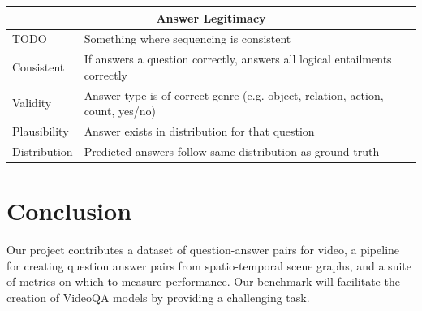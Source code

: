 \documentclass[10pt,twocolumn,letterpaper]{article}
\begin{document}
\begin{table}[]
\begin{center}
\begin{tabular}{|p{2cm}|p{5cm}|}
    
     \multicolumn{2}{|c|}{\textbf{Answer Legitimacy}}\\
    \hline
    TODO & Something where sequencing is consistent \\
    \hline
    Consistent & If answers a question correctly, answers all logical entailments correctly \\
    \hline
    Validity & Answer type is of correct genre (e.g. object, relation, action, count, yes/no)\\
    \hline
    Plausibility  & Answer exists in distribution for that question\\
    \hline
    Distribution & Predicted answers follow same distribution as ground truth\\
    \hline
    \end{tabular}
    \end{center}
\end{table}

\section{Conclusion}
Our project contributes a dataset of question-answer pairs for video, a pipeline for creating question answer pairs from spatio-temporal scene graphs, and a suite of metrics on which to measure performance.
Our benchmark will facilitate the creation of VideoQA models by providing a challenging task.

{\small


}
\end{document}
